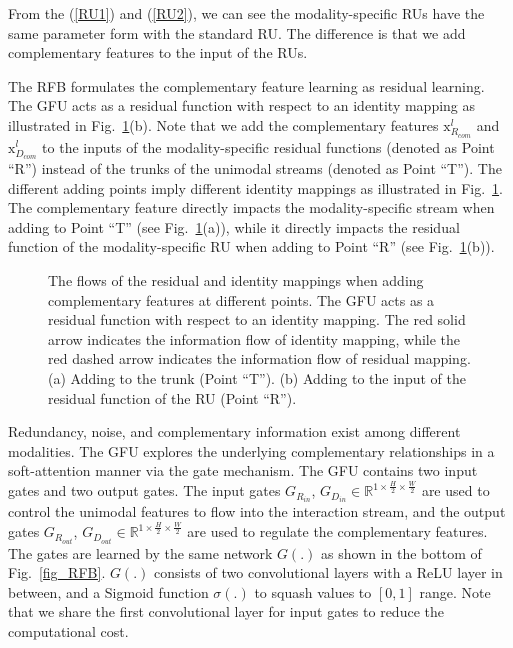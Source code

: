 \documentclass[letterpaper, 10 pt, conference]{ieeeconf}
\begin{document}
	From the (\ref{RU1}) and (\ref{RU2}), we can see the modality-specific RUs have the same parameter form with the standard RU\cite{he2016deep}. The difference is that we add complementary features to the input of the RUs. 
	
	The RFB formulates the complementary feature learning as residual learning. The GFU acts as a residual function with respect to an identity mapping as illustrated in Fig.~\ref{fig_res}(b). Note that we add the complementary features $\mathrm{x}^{l}_{R_{com}}$ and $\mathrm{x}^{l}_{D_{com}}$ to the inputs of the modality-specific residual functions (denoted as Point ``R'') instead of the trunks of the unimodal streams (denoted as Point ``T''). The different adding points imply different identity mappings as illustrated in Fig.~\ref{fig_res}. The complementary feature directly impacts the modality-specific stream when adding to Point ``T'' (see Fig.~\ref{fig_res}(a)), while it directly impacts the residual function of the modality-specific RU when adding to Point ``R'' (see Fig.~\ref{fig_res}(b)).
	


	\begin{figure}[!tb]
		\centering
		\hspace{4pt}
		\caption{The flows of the residual and identity mappings when adding complementary features at different points. The GFU acts as a residual function with respect to an identity mapping. The red solid arrow indicates the information flow of identity mapping, while the red dashed arrow indicates the information flow of residual mapping. (a) Adding to the trunk (Point ``T''). (b) Adding to the input of the residual function of the RU (Point ``R'').}
		\label{fig_res}
	\end{figure}
	
	Redundancy, noise, and complementary information exist among different modalities. The GFU explores the underlying complementary relationships in a soft-attention manner via the gate mechanism.
	The GFU contains two input gates and two output gates. The input gates $G_{R_{in}}$, $G_{D_{in}}\in \mathbb{R}^{1\times \frac{H}{2}\times \frac{W}{2}}$ are used to control the unimodal features to flow into the interaction stream, and the output gates $G_{R_{out}}$, $G_{D_{out}}\in \mathbb{R}^{1\times \frac{H}{2}\times \frac{W}{2}}$ are used to regulate the complementary features. The gates are learned by the same network $G(.)$ as shown in the bottom of Fig.~\ref{fig_RFB}. $G(.)$ consists of two convolutional layers with a ReLU layer in between, and a Sigmoid function $\sigma(.)$ to squash values to $[0, 1]$ range. Note that we share the first convolutional layer for input gates to reduce the computational cost. 
	
\end{document}
